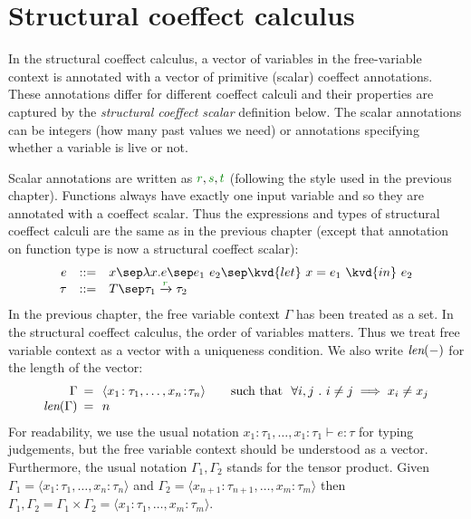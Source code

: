 \section{Structural coeffect calculus}
\label{sec:struct-calculus}

In the structural coeffect calculus, a vector of variables in the free-variable context is 
annotated with a vector of primitive (scalar) coeffect annotations. These annotations differ
for different coeffect calculi and their properties are captured by the \emph{structural 
coeffect scalar} definition below. The scalar annotations can be integers (how many past values we 
need) or annotations specifying whether a variable is live or not.

Scalar annotations are written as $\cclrd{r}, \cclrd{s}, \cclrd{t}$ (following the style used in 
the previous chapter). Functions always have exactly one input variable and so they are annotated
with a coeffect scalar. Thus the expressions and types of structural coeffect calculi are the same
as in the previous chapter (except that annotation on function type is now a structural coeffect 
scalar):
%
\begin{equation*}
\begin{array}{rcl}
e &::=& x \sep \lambda x.e \sep e_1~e_2 \sep \kvd{let}~x = e_1~\kvd{in}~e_2\\
\tau &::=& T \sep \tau_1 \xrightarrow{\cclrd{r}} \tau_2
\end{array}
\end{equation*}
%
In the previous chapter, the free variable context $\Gamma$ has been treated as a set. In the 
structural coeffect calculus, the order of variables matters. Thus we treat free variable context
as a vector with a uniqueness condition. We also write ${\textit{len}(-)}$ for the length
of the vector:
%
\begin{equation*}
\begin{array}{rcl}
 \Gamma &\narrow{=}& \langle x_1\!:\tau_1, \ldots, x_n\!:\!\tau_n \rangle \qquad \textnormal{such that}~~\forall i, j ~.~ i \neq j \implies x_i \neq x_j\\
 \xlift{\Gamma} &\narrow{=}& n
\end{array}
\end{equation*}
%
For readability, we use the usual notation $x_1\!:\!\tau_1, \ldots, x_1\!:\!\tau_1 \vdash e : \tau$ for
typing judgements, but the free variable context should be understood as a vector.
Furthermore, the usual notation $\Gamma_1, \Gamma_2$ stands for the tensor product.
Given $\Gamma_1 = \langle x_1\!:\tau_1, \ldots, x_n\!:\!\tau_n \rangle $ and
$\Gamma_2 = \langle x_{n+1}\!:\tau_{n+1}, \ldots, x_m\!:\!\tau_m \rangle $ then
$\Gamma_1, \Gamma_2 = \Gamma_1 \times \Gamma_2 = \langle x_1\!:\tau_1, \ldots, x_m\!:\!\tau_m \rangle$.

